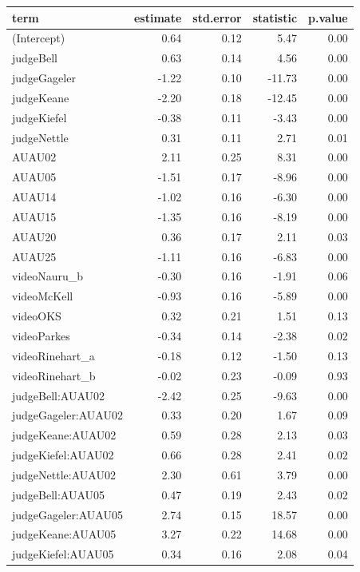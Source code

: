 \documentclass{monashthesis}
\begin{document}
\begin{tabular}{l|r|r|r|r}
\hline
term & estimate & std.error & statistic & p.value\\
\hline
(Intercept) & 0.64 & 0.12 & 5.47 & 0.00\\
\hline
judgeBell & 0.63 & 0.14 & 4.56 & 0.00\\
\hline
judgeGageler & -1.22 & 0.10 & -11.73 & 0.00\\
\hline
judgeKeane & -2.20 & 0.18 & -12.45 & 0.00\\
\hline
judgeKiefel & -0.38 & 0.11 & -3.43 & 0.00\\
\hline
judgeNettle & 0.31 & 0.11 & 2.71 & 0.01\\
\hline
AUAU02 & 2.11 & 0.25 & 8.31 & 0.00\\
\hline
AUAU05 & -1.51 & 0.17 & -8.96 & 0.00\\
\hline
AUAU14 & -1.02 & 0.16 & -6.30 & 0.00\\
\hline
AUAU15 & -1.35 & 0.16 & -8.19 & 0.00\\
\hline
AUAU20 & 0.36 & 0.17 & 2.11 & 0.03\\
\hline
AUAU25 & -1.11 & 0.16 & -6.83 & 0.00\\
\hline
videoNauru\_b & -0.30 & 0.16 & -1.91 & 0.06\\
\hline
videoMcKell & -0.93 & 0.16 & -5.89 & 0.00\\
\hline
videoOKS & 0.32 & 0.21 & 1.51 & 0.13\\
\hline
videoParkes & -0.34 & 0.14 & -2.38 & 0.02\\
\hline
videoRinehart\_a & -0.18 & 0.12 & -1.50 & 0.13\\
\hline
videoRinehart\_b & -0.02 & 0.23 & -0.09 & 0.93\\
\hline
judgeBell:AUAU02 & -2.42 & 0.25 & -9.63 & 0.00\\
\hline
judgeGageler:AUAU02 & 0.33 & 0.20 & 1.67 & 0.09\\
\hline
judgeKeane:AUAU02 & 0.59 & 0.28 & 2.13 & 0.03\\
\hline
judgeKiefel:AUAU02 & 0.66 & 0.28 & 2.41 & 0.02\\
\hline
judgeNettle:AUAU02 & 2.30 & 0.61 & 3.79 & 0.00\\
\hline
judgeBell:AUAU05 & 0.47 & 0.19 & 2.43 & 0.02\\
\hline
judgeGageler:AUAU05 & 2.74 & 0.15 & 18.57 & 0.00\\
\hline
judgeKeane:AUAU05 & 3.27 & 0.22 & 14.68 & 0.00\\
\hline
judgeKiefel:AUAU05 & 0.34 & 0.16 & 2.08 & 0.04\\

\end{tabular}
\end{document}

